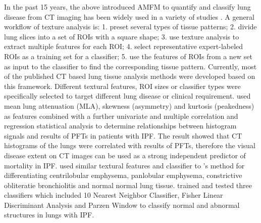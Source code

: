 In the past 15 years, the above introduced AMFM to quantify and classify lung disease from CT imaging has been widely used in a variety of studies \citep{van2002automatic,chabat2003obstructive,best2003quantitative,uchiyama2003quantitative,kim2005computer,zavaletta2006high,arzhaeva2007computer,best2008idiopathic,kim2010computer,kim2011quantitative,kim2015comparison}. A general workflow of texture analysis is: 1. preset several types of tissue patterns; 2. divide lung slices into a set of ROIs with a square shape; 3. use texture analysis to extract multiple features for each ROI; 4. select representative expert-labeled ROIs as a training set for a classifier; 5. use the features of ROIs from a new set as input to the classifier to find the corresponding tissue pattern. Currently, most of the published CT based lung tissue analysis methods were developed based on this framework. Different textural features, ROI sizes or classifier types were specifically selected to target different lung disease or clinical requirement. \cite{best2003quantitative,best2008idiopathic} used mean lung attenuation (MLA), skewness (asymmetry) and kurtosis (peakedness) as features combined with a further univariate and multiple correlation and regression statistical analysis to determine relationships between histogram signals and results of PFTs in patients with IPF. The result showed that CT histograms of the lungs were correlated with results of PFTs, therefore the visual disease extent on CT images can be used as a strong independent predictor of mortality in IPF. \cite{chabat2003obstructive} used similar textural features and classifier to \cite{best2003quantitative,best2008idiopathic}'s method for differentiating centrilobular emphysema, panlobular emphysema, constrictive obliteratie bronchiolitis and normal normal lung tissue. \cite{zavaletta2007high} trained and tested three classifiers which included 10 Nearest Neighbor Classifier, Fisher Linear Discriminant Analysis and Parzen Window to classify normal and abnormal structures in lungs with IPF. 

